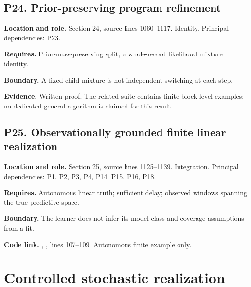 \documentclass[11pt,letterpaper]{article}
\begin{document}
\par\noindent\begin{minipage}{\textwidth}
\subsection{P24. Prior-preserving program
refinement}\label{p24.-prior-preserving-program-refinement}

\textbf{Location and role.} Section 24, source lines 1060--1117.
Identity. Principal dependencies: P23.

\textbf{Requires.} Prior-mass-preserving split; a whole-record
likelihood mixture identity.

\textbf{Boundary.} A fixed child mixture is not independent switching at
each step.

\textbf{Evidence.} Written proof. The related suite contains finite
block-level examples; no dedicated general algorithm is claimed for this
result.
\end{minipage}\par\medskip

\par\noindent\begin{minipage}{\textwidth}
\subsection{P25. Observationally grounded finite linear
realization}\label{p25.-observationally-grounded-finite-linear-realization}

\textbf{Location and role.} Section 25, source lines 1125--1139.
Integration. Principal dependencies: P1, P2, P3, P4, P14, P15, P16, P18.

\textbf{Requires.} Autonomous linear truth; sufficient delay; observed
windows spanning the true predictive space.

\textbf{Boundary.} The learner does not infer its model-class and
coverage assumptions from a fit.

\textbf{Code link.} ,
, lines 107--109. Autonomous finite example only.
\end{minipage}\par\medskip

\newpage

\section{Controlled stochastic
realization}\label{controlled-stochastic-realization}
\end{document}
